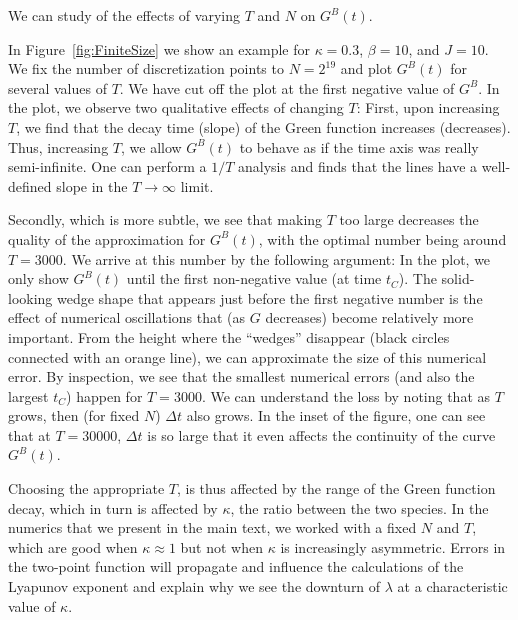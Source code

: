 We can study of the effects of varying $T$ and $N$ on $G^B(t)$.

In Figure~\ref{fig:FiniteSize} we show an example for $\kappa=0.3$, $\beta=10$, and $J=10$.
We fix the number of discretization points to $N=2^{19}$ and plot $G^{B}(t)$ for several values of $T$. We have cut off the plot at the first negative value of $G^B$.
In the plot, we observe two qualitative effects of changing $T$: First, upon increasing $T$,
we find that the decay time (slope) of the Green function increases (decreases). Thus, increasing $T$, we allow $G^B(t)$ to behave as if the time axis was really semi-infinite.
One can perform a $1/T$ analysis and finds that the lines have a well-defined slope in the $T\to\infty$ limit.

Secondly, which is more subtle, we see that making $T$ too large decreases the quality of the approximation for $G^B(t)$, with the optimal number being around $T=3000$.
We arrive at this number by the following argument: In the plot, we only show $G^B(t)$ until the first non-negative value (at time $t_C$).
The solid-looking wedge shape that appears just before the first negative number is the effect of numerical oscillations that (as $G$ decreases) become relatively more important.
From the height where the ``wedges'' disappear (black circles connected with an orange line), we can approximate the size of this numerical error.
By inspection, we see that the smallest numerical errors (and also the largest $t_C$) happen for $T=3000$.
We can understand the loss by noting that as $T$ grows, then (for fixed $N$) $\Delta t$ also grows.
In the inset of the figure, one can see that at $T=30000$, $\Delta t$ is so large that it even affects the continuity of the curve $G^B(t)$.

Choosing the appropriate $T$, is thus affected by the range of the Green function decay, which in turn is affected by $\kappa$, the ratio between the two species.
In the numerics that we present in the main text, we worked with a fixed $N$ and $T$, which are good when $\kappa\approx1$ but not when $\kappa$ is increasingly asymmetric.
Errors in the two-point function will propagate and influence the calculations of the Lyapunov exponent and explain why we see the downturn of $\lambda$ at a characteristic value of $\kappa$.


